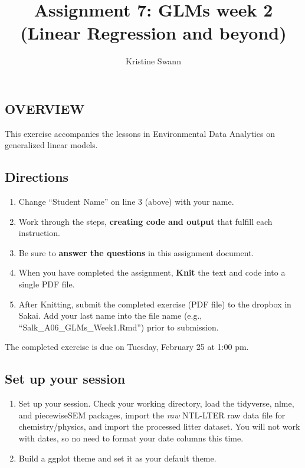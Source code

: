 \documentclass[
]{article}
\title{Assignment 7: GLMs week 2 (Linear Regression and beyond)}
\author{Kristine Swann}
\date{}
\providecommand{\tightlist}{%
  \setlength{\itemsep}{0pt}\setlength{\parskip}{0pt}}
\begin{document}
\maketitle

\hypertarget{overview}{%
\subsection{OVERVIEW}\label{overview}}

This exercise accompanies the lessons in Environmental Data Analytics on
generalized linear models.

\hypertarget{directions}{%
\subsection{Directions}\label{directions}}

\begin{enumerate}
\def\labelenumi{\arabic{enumi}.}
\tightlist
\item
  Change ``Student Name'' on line 3 (above) with your name.
\item
  Work through the steps, \textbf{creating code and output} that fulfill
  each instruction.
\item
  Be sure to \textbf{answer the questions} in this assignment document.
\item
  When you have completed the assignment, \textbf{Knit} the text and
  code into a single PDF file.
\item
  After Knitting, submit the completed exercise (PDF file) to the
  dropbox in Sakai. Add your last name into the file name (e.g.,
  ``Salk\_A06\_GLMs\_Week1.Rmd'') prior to submission.
\end{enumerate}

The completed exercise is due on Tuesday, February 25 at 1:00 pm.

\hypertarget{set-up-your-session}{%
\subsection{Set up your session}\label{set-up-your-session}}

\begin{enumerate}
\def\labelenumi{\arabic{enumi}.}
\item
  Set up your session. Check your working directory, load the tidyverse,
  nlme, and piecewiseSEM packages, import the \emph{raw} NTL-LTER raw
  data file for chemistry/physics, and import the processed litter
  dataset. You will not work with dates, so no need to format your date
  columns this time.
\item
  Build a ggplot theme and set it as your default theme.
\end{enumerate}
\end{document}
